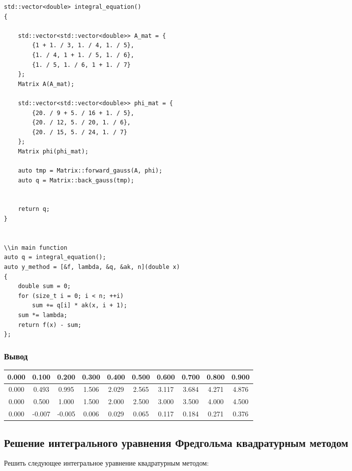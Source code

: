 \documentclass[bachelor, och, pract]{SCWorks}
\begin{document}
\begin{lstlisting}
std::vector<double> integral_equation()
{

    std::vector<std::vector<double>> A_mat = {
        {1 + 1. / 3, 1. / 4, 1. / 5},
        {1. / 4, 1 + 1. / 5, 1. / 6},
        {1. / 5, 1. / 6, 1 + 1. / 7}
    };
    Matrix A(A_mat);

    std::vector<std::vector<double>> phi_mat = {
        {20. / 9 + 5. / 16 + 1. / 5},
        {20. / 12, 5. / 20, 1. / 6},
        {20. / 15, 5. / 24, 1. / 7}
    };
    Matrix phi(phi_mat);

    auto tmp = Matrix::forward_gauss(A, phi);
    auto q = Matrix::back_gauss(tmp);


    return q;
}


\\in main function
auto q = integral_equation();
auto y_method = [&f, lambda, &q, &ak, n](double x)
{
    double sum = 0;
    for (size_t i = 0; i < n; ++i)
        sum += q[i] * ak(x, i + 1);
    sum *= lambda;
    return f(x) - sum;
};
\end{lstlisting}

\subsubsection{Вывод}

\begin{table}[H]
    \centering
    \begin{tabular}{|c|c|c|c|c|c|c|c|c|c|}
\hline 0.000  & 0.100   &0.200   & 0.300&0.400 &0.500 & 0.600 &   0.700 & 0.800   & 0.900\\\hline
0.000  & 0.493 & 0.995 & 1.506 & 2.029  & 2.565 & 3.117 &3.684   &            4.271  & 4.876\\\hline
0.000  & 0.500  & 1.000 & 1.500 & 2.000& 2.500 & 3.000&3.500&   4.000  &  4.500\\\hline
0.000&-0.007 &-0.005& 0.006  & 0.029 &0.065&0.117&0.184&0.271&    0.376\\\hline
    \end{tabular}
\end{table}


\subsection{Решение интегрального уравнения Фредгольма квадратурным методом}

Решить следующее интегральное уравнение квадратурным методом:
\end{document}
